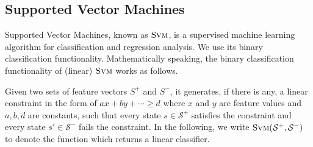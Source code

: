 \subsection{Supported Vector Machines}
Supported Vector Machines, known as $\textsc{Svm}$, is a supervised machine learning algorithm for classification and regression analysis. 
We use its binary classification functionality. 
Mathematically speaking, the binary classification functionality of (linear) $\textsc{Svm}$ works as follows. 

Given two sets of feature vectors $S^+$ and $S^-$, it generates, if there is any, 
a linear constraint in the form of $ax + by + \cdots \geq d$ where $x$ and $y$ are feature values and $a, b, d$ are constants, 
such that every state $s \in \mathcal{S}^+$ satisfies the constraint and every state $s' \in \mathcal{S}^-$ fails the constraint. 
In the following, we write $\textsc{Svm}(\mathcal{S}^+, \mathcal{S}^-)$ to denote the function which returns a linear classifier.


